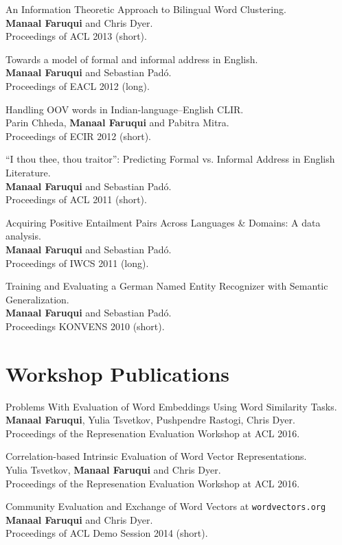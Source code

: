 \documentclass[margin,line]{res}
\begin{document}
\begin{resume}
An Information Theoretic Approach to Bilingual Word Clustering.\\
\textbf{Manaal Faruqui} and Chris Dyer.\\
Proceedings of ACL 2013 (short).

Towards a model of formal and informal address in English.\\
\textbf{Manaal Faruqui} and Sebastian Pad\'{o}.\\
Proceedings of EACL 2012 (long).

Handling OOV words in Indian-language--English CLIR.\\
Parin Chheda, \textbf{Manaal Faruqui} and Pabitra Mitra.\\
Proceedings of ECIR 2012 (short).

``I thou thee, thou traitor'': Predicting Formal vs. Informal Address in English Literature.\\
\textbf{Manaal Faruqui} and Sebastian Pad\'{o}.\\
Proceedings of ACL 2011 (short).

Acquiring Positive Entailment Pairs Across Languages \& Domains: A data analysis.\\
\textbf{Manaal Faruqui} and Sebastian Pad\'{o}.\\
Proceedings of IWCS 2011 (long).

Training and Evaluating a German Named Entity Recognizer with Semantic Generalization.\\
\textbf{Manaal Faruqui} and Sebastian Pad\'{o}.\\
Proceedings KONVENS 2010 (short).

\section{\sc Workshop Publications}

Problems With Evaluation of Word Embeddings Using Word Similarity Tasks.\\
\textbf{Manaal Faruqui}, Yulia Tsvetkov, Pushpendre Rastogi, Chris Dyer.\\
Proceedings of the Represenation Evaluation Workshop at ACL 2016.

Correlation-based Intrinsic Evaluation of Word Vector Representations.\\
Yulia Tsvetkov, \textbf{Manaal Faruqui} and Chris Dyer.\\
Proceedings of the Represenation Evaluation Workshop at ACL 2016.

Community Evaluation and Exchange of Word Vectors at \texttt{wordvectors.org}\\
\textbf{Manaal Faruqui} and Chris Dyer.\\
Proceedings of ACL Demo Session 2014 (short).


\end{resume}
\end{document}
